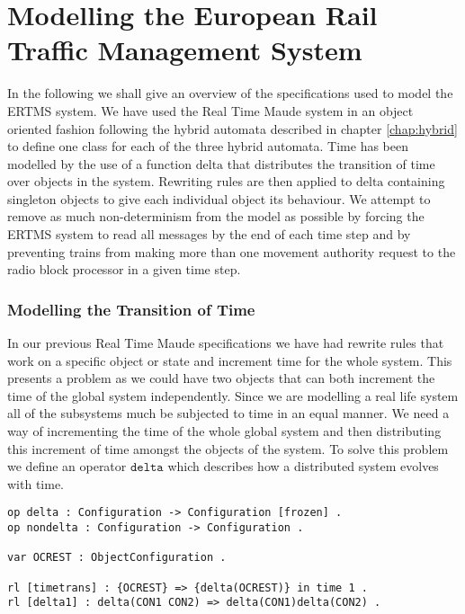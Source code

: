 \section{Modelling the European Rail Traffic Management System}
In the following we shall give an overview of the specifications used to model the ERTMS system. We have used the Real Time Maude system in an object oriented fashion following the hybrid automata described in chapter \ref{chap:hybrid} to define one class for each of the three hybrid automata. Time has been modelled by the use of a function $\mathrm{delta}$ that distributes the transition of time over objects in the system. Rewriting rules are then applied to $\mathrm{delta}$ containing singleton objects to give each individual object its behaviour. We attempt to remove as much non-determinism from the model as possible by forcing the ERTMS system to read all messages by the end of each time step and by preventing trains from making more than one movement authority request to the radio block processor in a given time step.


\subsubsection*{Modelling the Transition of Time}
In our previous Real Time Maude specifications we have had rewrite rules that work on a specific object or state and increment time for the whole system. This presents a problem as we could have two objects that can both increment the time of the global system independently.  Since we are modelling a real life system all of the subsystems much be subjected to time in an equal manner. We need a way of incrementing the time of the whole global system and then distributing this increment of time amongst the objects of the system. To solve this problem we define an operator $\texttt{delta}$ which describes how a distributed system evolves with time.

\begin{lstlisting}[caption = The delta time transition operation, label = code:delta]
op delta : Configuration -> Configuration [frozen] . 
op nondelta : Configuration -> Configuration .

var OCREST : ObjectConfiguration .

rl [timetrans] : {OCREST} => {delta(OCREST)} in time 1 .
rl [delta1] : delta(CON1 CON2) => delta(CON1)delta(CON2) .
\end{lstlisting}

